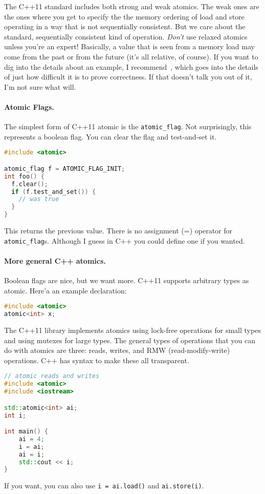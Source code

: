 The C++11 standard includes both strong and weak atomics. The weak ones are the ones where you get to specify the the memory ordering of load and store operating in a way that is not sequentially consistent. But we care about the standard, sequentially consistent kind of operation. \textit{Don't} use relaxed atomics unless you're an expert! Basically, a value that is seen from a memory load may come from the past or from the future (it's all relative, of course). If you want to dig into the details about an example, I recommend~\cite{bmref2}, which goes into the details of just how difficult it is to prove correctness. If that doesn't talk you out of it, I'm not sure what will.


\paragraph{Atomic Flags.} The simplest form of C++11 atomic is the {\tt atomic\_flag}.
Not surprisingly, this represents a boolean flag. You can clear the flag and test-and-set it.


\begin{lstlisting}[language=C++]
#include <atomic>

atomic_flag f = ATOMIC_FLAG_INIT;
int foo() {
  f.clear();
  if (f.test_and_set()) {
    // was true
  }
}
\end{lstlisting}

This returns the previous value. There is no assignment (=) operator for {\tt atomic\_flag}s. Although I guess in C++ you could define one if you wanted. 

\paragraph{More general C++ atomics.} Boolean flags are nice, but we want more.
C++11 supports arbitrary types as atomic. Here'a an example declaration:

\begin{lstlisting}[language=C++]
#include <atomic>
atomic<int> x;
\end{lstlisting}

The C++11 library implements atomics using lock-free operations for small types
and using mutexes for large types. The general types of operations that you can do with atomics are three: reads, writes, and RMW (read-modify-write) operations. C++ has syntax to make these all transparent.

\begin{lstlisting}[language=C++]
// atomic reads and writes
#include <atomic>
#include <iostream>

std::atomic<int> ai;
int i;

int main() {
    ai = 4;
    i = ai;
    ai = i;
    std::cout << i;
}
\end{lstlisting}
If you want, you can also use {\tt i = ai.load()} and {\tt ai.store(i)}.

